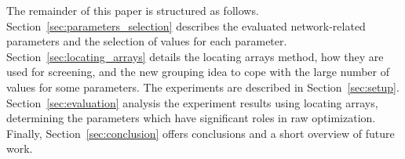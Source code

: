 The remainder of this paper is structured as follows. Section~\ref{sec:parameters_selection} describes the evaluated network-related parameters and the selection of values for each parameter. 
Section~\ref{sec:locating_arrays} details the locating arrays method, how they are used for screening, and the new grouping idea to cope with the large number of values for some parameters. The experiments are described in Section~\ref{sec:setup}. Section~\ref{sec:evaluation} analysis the experiment results using locating arrays, determining the parameters which have significant roles in \gls{raw} optimization.
Finally, Section~\ref{sec:conclusion} offers conclusions and a short overview of future work.













